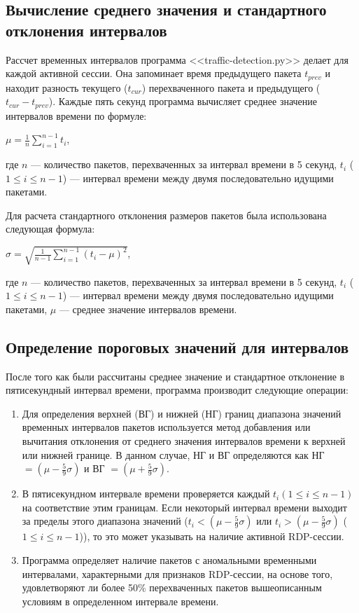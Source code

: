 \documentclass[bachelor, och, coursework]{SCWorks}
\begin{document}
\subsection{Вычисление среднего значения и стандартного отклонения интервалов}
Рассчет временных интервалов программа <<traffic-detection.py>> делает для каждой активной сессии. Она запоминает время предыдущего пакета $t_{prev}$ и 
находит разность текущего ($t_{cur}$) перехваченного пакета и предыдущего ($t_{cur} - t_{prev}$). Каждые пять секунд программа вычисляет 
среднее значение интервалов времени по формуле:

\begin{center}
  $\mu = \frac{1}{n}\sum_{i = 1}^{n - 1} t_{i}$,
\end{center}

где $n$ --- количество пакетов, перехваченных за интервал времени в 5 секунд, $t_i$ ($1 \leq i \leq n - 1$) --- интервал времени между двумя 
последовательно идущими пакетами.

Для расчета стандартного отклонения размеров пакетов была использована следующая формула:

\begin{center}
  $\sigma = \sqrt{\frac{1}{n - 1} \sum_{i = 1}^{n - 1} (t_{i} - \mu)^2}$,
\end{center}

где $n$ --- количество пакетов, перехваченных за интервал времени в 5 секунд, $t_i$ ($1 \leq i \leq n - 1$) --- интервал времени между двумя 
последовательно идущими пакетами, 
$\mu$ --- среднее значение интервалов времени.

\subsection{Определение пороговых значений для интервалов}


После того как были рассчитаны среднее значение и стандартное отклонение в пятисекундный интервал времени, программа производит следующие операции:

\begin{enumerate}
  \item Для определения верхней (ВГ) и нижней (НГ) границ диапазона значений временных интервалов пакетов используется метод добавления или 
  вычитания отклонения от среднего значения интервалов времени к верхней или нижней границе. В данном случае, НГ и ВГ определяются как 
  НГ $= (\mu - \frac{5}{9}\sigma)$ и ВГ $= (\mu + \frac{5}{9}\sigma)$. 
  \item В пятисекундном интервале времени проверяется каждый $t_i (1 \leq i \leq n - 1)$ на соответствие этим границам. 
  Если некоторый интервал времени выходит за пределы этого диапазона значений ($t_i < (\mu - \frac{5}{9}\sigma)$ или $t_i > (\mu - \frac{5}{9}\sigma)$ 
  ($1 \leq i \leq n - 1$)), то это может указывать на наличие активной RDP-сессии.
  \item Программа определяет наличие пакетов с аномальными временными интервалами, характерными для признаков RDP-сессии, на основе того, 
  удовлетворяют ли более 50\% перехваченных пакетов вышеописанным условиям в определенном интервале времени.
\end{enumerate}
\end{document}
